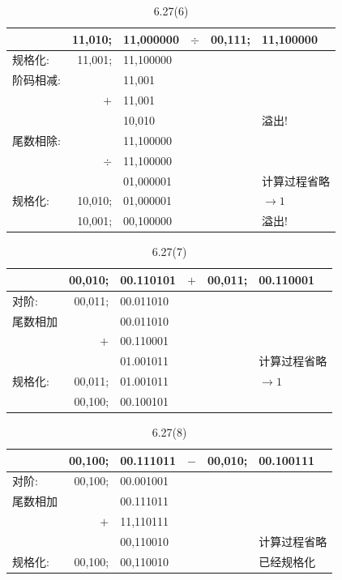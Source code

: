\documentclass[UTF8]{report}
\newenvironment{solution}{{\noindent\hskip 2em \bf 解 \quad}}{}
\begin{document}
\begin{solution}
    \begin{table}[htb]
        \centering
        \caption{6.27(6)}
        \label{tab:6_27_6}
        \begin{tabular}{l|rlcrl}
         & 11,010; & 11,000000 & $\div$ & 00,111; & 11,100000 \\ \hline
        规格化: & 11,001; & 11,100000 &  &  &  \\ \hline
        阶码相减: &  & 11,001 &  &  &  \\
         & $+$ & 11,001 &  &  &  \\ \cline{2-3}
         &  & 10,010 &  &  & 溢出!  \\ \hline
        尾数相除: &  & 11,100000 &  &  &  \\
         & $\div$ & 11,100000 &  &  &  \\ \cline{2-3}
         &  & 01,000001 &  &  & 计算过程省略 \\ \hline
        规格化: & 10,010; & 01,000001 &  &  & $\rightarrow 1$ \\
         & 10,001; & 00,100000 &  &  & 溢出!
        \end{tabular}
    \end{table}

    \begin{table}[htb]
        \centering
        \caption{6.27(7)}
        \label{tab:6_27_7}
        \begin{tabular}{l|rlcrl}
         & 00,010; & 00.110101 & $+$ & 00,011; & 00.110001 \\ \hline
        对阶: & 00,011; & 00.011010 &  &  &  \\ \hline
        尾数相加 &  & 00.011010 &  &  &  \\
         & $+$ & 00.110001 &  &  &  \\ \cline{2-3}
         &  & 01.001011 &  &  & 计算过程省略 \\ \hline
        规格化: & 00,011; & 01.001011 &  &  & $\rightarrow 1$ \\
         & 00,100; & 00.100101 &  &  & 
        \end{tabular}
    \end{table}

    \begin{table}[htb]
        \centering
        \caption{6.27(8)}
        \label{tab:6_27_8}
        \begin{tabular}{l|rlcrl}
         & 00,100; & 00.111011 & $-$ & 00,010; & 00.100111 \\ \hline
        对阶: & 00,100; & 00.001001 &  &  &  \\ \hline
        尾数相加 &  & 00.111011 &  &  &  \\
         & $+$ & 11,110111 &  &  &  \\ \cline{2-3}
         &  & 00,110010 &  &  & 计算过程省略 \\ \hline
        规格化: & 00,100; & 00,110010 &  &  & 已经规格化 \\
        \end{tabular}
        \end{table}\end{solution}
\end{document}
